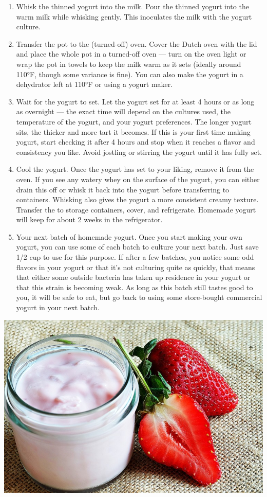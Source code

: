 \begin{enumerate}
\item Whisk the thinned yogurt into the milk. Pour the thinned yogurt into the warm milk while whisking 
gently. This inoculates the milk with the yogurt culture.
\item Transfer the pot to the (turned-off) oven. Cover the Dutch oven with the lid and place the 
whole pot in a turned-off oven — turn on the oven light or wrap the pot in towels to keep the milk warm 
as it sets (ideally around 110°F, though some variance is fine). You can also make the yogurt in a dehydrator 
left at 110°F or using a yogurt maker.
\item Wait for the yogurt to set. Let the yogurt set for at least 4 hours or as long as overnight — 
the exact time will depend on the cultures used, the temperature of the yogurt, and your yogurt preferences. 
The longer yogurt sits, the thicker and more tart it becomes. If this is your first time making yogurt, start checking 
it after 4 hours and stop when it reaches a flavor and consistency you like. Avoid jostling or stirring the yogurt until 
it has fully set.
\item Cool the yogurt. Once the yogurt has set to your liking, remove it from the oven. If you see any watery whey 
on the surface of the yogurt, you can either drain this off or whisk it back into the yogurt before transferring to 
containers. Whisking also gives the yogurt a more consistent creamy texture. Transfer the to storage containers,
cover, and refrigerate. Homemade yogurt will keep for about 2 weeks in the refrigerator.
\item Your next batch of homemade yogurt. Once you start making your own yogurt, you can use some of each 
batch to culture your next batch. Just save 1/2 cup to use for this purpose. If after a few batches, you notice some 
odd flavors in your yogurt or that it's not culturing quite as quickly, that means that either some outside bacteria has 
taken up residence in your yogurt or that this strain is becoming weak. As long as this batch still tastes good to you,
it will be safe to eat, but go back to using some store-bought commercial yogurt in your next batch.
\end {enumerate}
\includegraphics[scale = 0.5,natwidth=610,natheight=642]{yoghurt.jpg}


